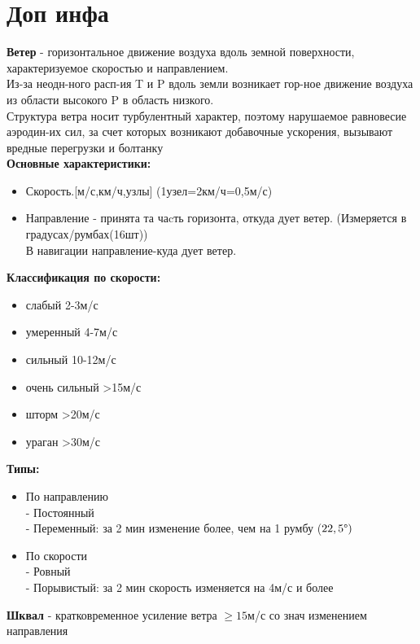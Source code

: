 
\section{Доп инфа}
\textbf{Ветер} - горизонтальное движение воздуха вдоль земной поверхности, характеризуемое скоростью и направлением. \\
Из-за неодн-ного расп-ия T и P вдоль земли возникает гор-ное движение воздуха из области высокого P в область низкого.\\
Структура ветра носит турбулентный характер, поэтому нарушаемое равновесие аэродин-их сил, за счет которых возникают добавочные ускорения, вызывают вредные перегрузки и болтанку\\
\textbf{Основные характеристики:}
\begin{itemize}
	\item Скорость.[м/с,км/ч,узлы] (1узел=2км/ч=0,5м/с)
	\item Направление - принята та чаcть горизонта, откуда дует ветер. (Измеряется в градусах/румбах(16шт))\\
	В навигации направление-куда дует ветер.
\end{itemize} 
\textbf{Классификация по скорости:}
\begin{itemize}
	\item слабый 2-3м/с
	\item умеренный 4-7м/с
	\item сильный 10-12м/с
	\item очень сильный >15м/с
	\item шторм >20м/с
	\item ураган >30м/с
\end{itemize}
\textbf{Типы:}
\begin{itemize}
	\item По направлению\\
	- \hspace{2ex} Постоянный\\
	- \hspace{2ex} Переменный: за 2 мин изменение более, чем на 1 румбу ($22,5\degree)$
	\item По скорости\\
	- \hspace{2ex} Ровный\\
	- \hspace{2ex} Порывистый: за 2 мин скорость изменяется на 4м/с и более
\end{itemize}
\textbf{Шквал} - кратковременное усиление ветра $\geqslant15$м/с со знач изменением направления\\

